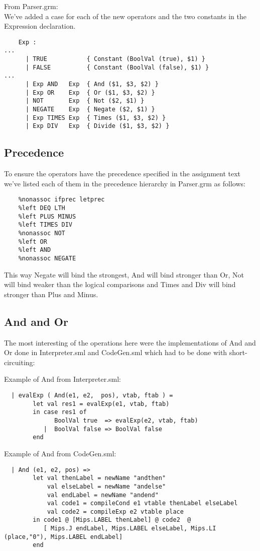 \documentclass{article}
\begin{document}
From Parser.grm:\\
\noindent We've added a case for each of the new operators and the two constants in the Expression declaration.
\begin{lstlisting}
    Exp :
...
      | TRUE           { Constant (BoolVal (true), $1) }
      | FALSE          { Constant (BoolVal (false), $1) }
...
      | Exp AND   Exp  { And ($1, $3, $2) }
      | Exp OR    Exp  { Or ($1, $3, $2) }
      | NOT       Exp  { Not ($2, $1) }
      | NEGATE    Exp  { Negate ($2, $1) }
      | Exp TIMES Exp  { Times ($1, $3, $2) }
      | Exp DIV   Exp  { Divide ($1, $3, $2) }
\end{lstlisting}


\subsection{Precedence}
To ensure the operators have the precedence specified in the assignment text we've listed each of them in the precedence hierarchy in Parser.grm as follows: 
\begin{lstlisting}
    %nonassoc ifprec letprec
    %left DEQ LTH
    %left PLUS MINUS
    %left TIMES DIV
    %nonassoc NOT
    %left OR
    %left AND
    %nonassoc NEGATE
\end{lstlisting}
This way Negate will bind the strongest, And will bind stronger than Or, Not will bind weaker than the logical comparisons and Times and Div will bind stronger than Plus and Minus.

\subsection{And and Or}
The most interesting of the operations here were the implementations of And and Or done in Interpreter.sml and CodeGen.sml
which had to be done with short-circuiting:

\noindent Example of And from Interpreter.sml:
\begin{lstlisting}
  | evalExp ( And(e1, e2,  pos), vtab, ftab ) =
        let val res1 = evalExp(e1, vtab, ftab)
        in case res1 of
              BoolVal true  => evalExp(e2, vtab, ftab)
           |  BoolVal false => BoolVal false
        end
\end{lstlisting}

\noindent Example of And from CodeGen.sml:
\begin{lstlisting}
  | And (e1, e2, pos) =>
        let val thenLabel = newName "andthen"
            val elseLabel = newName "andelse"
            val endLabel = newName "andend"
            val code1 = compileCond e1 vtable thenLabel elseLabel
            val code2 = compileExp e2 vtable place
        in code1 @ [Mips.LABEL thenLabel] @ code2  @
           [ Mips.J endLabel, Mips.LABEL elseLabel, Mips.LI (place,"0"), Mips.LABEL endLabel]
        end
\end{lstlisting}
\end{document}
